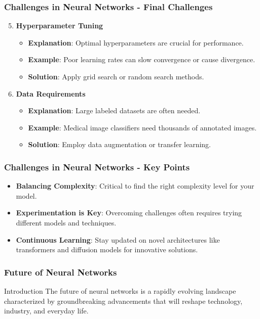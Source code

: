 \documentclass[aspectratio=169]{beamer}
\begin{document}
\begin{frame}[fragile]
    \frametitle{Challenges in Neural Networks - Final Challenges}
    \begin{enumerate}
        \setcounter{enumi}{4}
        \item \textbf{Hyperparameter Tuning}
            \begin{itemize}
                \item \textbf{Explanation}: Optimal hyperparameters are crucial for performance.
                \item \textbf{Example}: Poor learning rates can slow convergence or cause divergence.
                \item \textbf{Solution}: Apply grid search or random search methods.
            \end{itemize}
        
        \item \textbf{Data Requirements}
            \begin{itemize}
                \item \textbf{Explanation}: Large labeled datasets are often needed.
                \item \textbf{Example}: Medical image classifiers need thousands of annotated images.
                \item \textbf{Solution}: Employ data augmentation or transfer learning.
            \end{itemize}
    \end{enumerate}
\end{frame}

\begin{frame}[fragile]
    \frametitle{Challenges in Neural Networks - Key Points}
    \begin{itemize}
        \item \textbf{Balancing Complexity}: Critical to find the right complexity level for your model.
        \item \textbf{Experimentation is Key}: Overcoming challenges often requires trying different models and techniques.
        \item \textbf{Continuous Learning}: Stay updated on novel architectures like transformers and diffusion models for innovative solutions.
    \end{itemize}
\end{frame}

\begin{frame}[fragile]
    \frametitle{Future of Neural Networks}
    \begin{block}{Introduction}
        The future of neural networks is a rapidly evolving landscape characterized by groundbreaking advancements that will reshape technology, industry, and everyday life.
    \end{block}
\end{frame}
\end{document}
